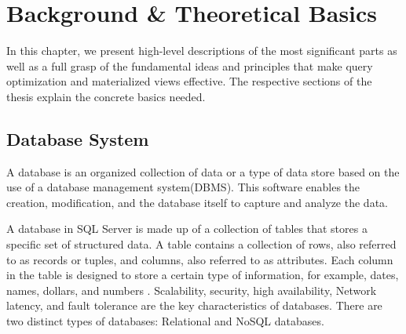 \section{Background \& Theoretical Basics }

In this chapter, we present high-level descriptions of the most significant parts as well as a full grasp of the fundamental ideas and principles that make query optimization and materialized views effective. The respective sections of the thesis explain the concrete basics needed.

\subsection{ Database System}

\begin{definition}
A database is an organized collection of data or a type of data store based on the use of a database management system(DBMS). This software enables the creation, modification, and the database itself to capture and analyze the data. \end{definition}
A database in SQL Server is made up of a collection of tables that stores a specific set of structured data. A table contains a collection of rows, also referred to as records or tuples, and columns, also referred to as attributes. Each column in the table is designed to store a certain type of information, for example, dates, names, dollars, and numbers \cite{williamdassafmsft-2024}. Scalability, security, high availability, Network latency, and fault tolerance are the key characteristics of databases. There are two distinct types of databases: Relational and NoSQL databases.

